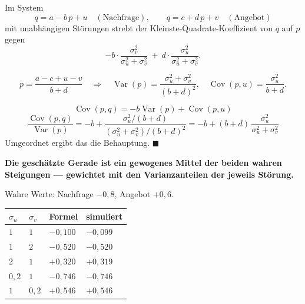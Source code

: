\begin{merksatz}
Im System
\[ q = a - b\,p + u \quad(\text{Nachfrage}), \qquad q = c + d\,p + v \quad(\text{Angebot}) \]
mit unabhängigen Störungen strebt der Kleinste-Quadrate-Koeffizient von $q$ auf $p$ gegen
\[ -b\cdot\frac{\sigma_v^{2}}{\sigma_u^{2}+\sigma_v^{2}} \ + \ d\cdot\frac{\sigma_u^{2}}{\sigma_u^{2}+\sigma_v^{2}} . \]

\[ p = \frac{a-c+u-v}{b+d} \quad\Longrightarrow\quad \operatorname{Var}(p) = \frac{\sigma_u^{2}+\sigma_v^{2}}{(b+d)^{2}}, \quad \operatorname{Cov}(p,u) = \frac{\sigma_u^{2}}{b+d} . \]

\[ \operatorname{Cov}(p,q) = -b\operatorname{Var}(p) + \operatorname{Cov}(p,u) \]
\[ \frac{\operatorname{Cov}(p,q)}{\operatorname{Var}(p)} = -b + \frac{\sigma_u^{2}/(b+d)}{(\sigma_u^{2}+\sigma_v^{2})/(b+d)^{2}} = -b + (b+d)\,\frac{\sigma_u^{2}}{\sigma_u^{2}+\sigma_v^{2}} \]
Umgeordnet ergibt das die Behauptung. $\blacksquare$

\begin{center}
\begin{minipage}{0.9\textwidth}
\textbf{Die geschätzte Gerade ist ein gewogenes Mittel der beiden wahren Steigungen --- gewichtet mit den Varianzanteilen der jeweils  Störung.}
\end{minipage}
\end{center}

Wahre Werte: Nachfrage $-0{,}8$, Angebot $+0{,}6$.

\begin{center}
{\small
\renewcommand{\arraystretch}{1.48}
\begin{tabular}{@{}P{1.6cm}P{1.6cm}P{2.0cm}P{2.0cm}@{}}
\toprule
$\sigma_u$ & $\sigma_v$ & \textbf{Formel} & \textbf{simuliert}\\
\midrule
$1$ & $1$ & $-0{,}100$ & $-0{,}099$\\
$1$ & $2$ & $-0{,}520$ & $-0{,}520$\\
$2$ & $1$ & $+0{,}320$ & $+0{,}319$\\
$0{,}2$ & $1$ & $-0{,}746$ & $-0{,}746$\\
$1$ & $0{,}2$ & $+0{,}546$ & $+0{,}546$\\
\bottomrule
\end{tabular}}
\end{center}


\end{merksatz}
